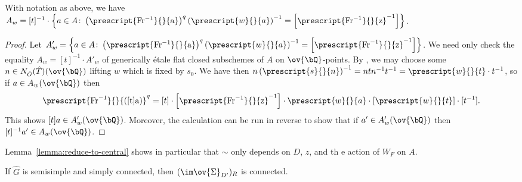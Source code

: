\begin{lemma}\label{lemma:reduce-to-central}
    With notation as above, we have $A_w = [t]^{-1} \cdot \left\{a \in A\colon \left(\prescript{\rm{Fr^{-1}}}{}{a}\right)^q\left(\prescript{w}{}{a}\right)^{-1} = \left[\prescript{\rm{Fr}^{-1}}{}{z}^{-1}\right]\right\}$.
\end{lemma}

\begin{proof}
    Let $A'_w = \left\{a \in A\colon \left(\prescript{\rm{Fr^{-1}}}{}{a}\right)^q\left(\prescript{w}{}{a}\right)^{-1} = \left[\prescript{\rm{Fr}^{-1}}{}{z}^{-1}\right]\right\}$. We need only check the equality $A_w = [t]^{-1} \cdot A'_w$ of generically \'etale flat closed subschemes of $A$ on $\ov{\bQ}$-points. By \cite[1.15]{Digne-Michel}, we may choose some $n \in N_{\hat{G}}(\hat{T})(\ov{\bQ})$ lifting $w$ which is fixed by $s_0$. We have then $n\left(\prescript{s}{}{n}\right)^{-1} = ntn^{-1}t^{-1} = \prescript{w}{}{t} \cdot t^{-1}$, so if $a \in A_w(\ov{\bQ})$ then
    \[
    \prescript{\rm{Fr}^{-1}}{}{\left([t]a\right)}^{q} = [t] \cdot \left[\prescript{\rm{Fr}^{-1}}{}{z}^{-1}\right] \cdot \prescript{w}{}{a} \cdot [\prescript{w}{}{t}] \cdot [t^{-1}].
    \]
    This shows $[t]a \in A'_w(\ov{\bQ})$. Moreover, the calculation can be run in reverse to show that if $a' \in A'_w(\ov{\bQ})$ then $[t]^{-1}a' \in A_w(\ov{\bQ})$.
\end{proof}

Lemma~\ref{lemma:reduce-to-central} shows in particular that $\sim$ only depends on $D$, $z$, and th e action of $W_F$ on $A$.

\begin{prop}\label{prop:eigenvalues-connected}
    If $\hat{G}$ is semisimple and simply connected, then $(\im \ov{\Sigma}_{D'})_R$ is connected.
\end{prop}

